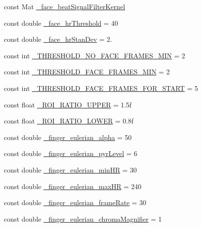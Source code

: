 \begin{DoxyCompactItemize}
\item 
const Mat \hyperlink{namespace_m_h_r_a846528ce2187823d06b73caadf751570}{\+\_\+face\+\_\+beat\+Signal\+Filter\+Kernel}
\item 
const double \hyperlink{namespace_m_h_r_a1e8025b0c611a1a8b4bf74baca52c91c}{\+\_\+face\+\_\+hr\+Threshold} = 40
\item 
const double \hyperlink{namespace_m_h_r_a0eb61186bc00ecb180d50821bee1d360}{\+\_\+face\+\_\+hr\+Stan\+Dev} = 2.
\item 
const int \hyperlink{namespace_m_h_r_adc786b108805d8d2ad944595ea2b7092}{\+\_\+\+T\+H\+R\+E\+S\+H\+O\+L\+D\+\_\+\+N\+O\+\_\+\+F\+A\+C\+E\+\_\+\+F\+R\+A\+M\+E\+S\+\_\+\+M\+I\+N} = 2
\item 
const int \hyperlink{namespace_m_h_r_a90f94ddb83c7c54b9b0836586a51ad43}{\+\_\+\+T\+H\+R\+E\+S\+H\+O\+L\+D\+\_\+\+F\+A\+C\+E\+\_\+\+F\+R\+A\+M\+E\+S\+\_\+\+M\+I\+N} = 2
\item 
const int \hyperlink{namespace_m_h_r_a3c94a936257b6f3257fb7a7768ff4377}{\+\_\+\+T\+H\+R\+E\+S\+H\+O\+L\+D\+\_\+\+F\+A\+C\+E\+\_\+\+F\+R\+A\+M\+E\+S\+\_\+\+F\+O\+R\+\_\+\+S\+T\+A\+R\+T} = 5
\item 
const float \hyperlink{namespace_m_h_r_a4059754ac07ffb5b08e096059f347a82}{\+\_\+\+R\+O\+I\+\_\+\+R\+A\+T\+I\+O\+\_\+\+U\+P\+P\+E\+R} = 1.\+5f
\item 
const float \hyperlink{namespace_m_h_r_a8a54577ca92c7aa81cc87355a7160063}{\+\_\+\+R\+O\+I\+\_\+\+R\+A\+T\+I\+O\+\_\+\+L\+O\+W\+E\+R} = 0.\+8f
\item 
const double \hyperlink{namespace_m_h_r_abe389732cdfc0aa8ebf51a84c4e645a4}{\+\_\+finger\+\_\+eulerian\+\_\+alpha} = 50
\item 
const double \hyperlink{namespace_m_h_r_a197af9978c9b4d443571197f5ad1b019}{\+\_\+finger\+\_\+eulerian\+\_\+pyr\+Level} = 6
\item 
const double \hyperlink{namespace_m_h_r_a2d844de82559885b3d8a333c82b1a733}{\+\_\+finger\+\_\+eulerian\+\_\+min\+H\+R} = 30
\item 
const double \hyperlink{namespace_m_h_r_ab2ef19fc7e685e8a85fbbbc75320fd6e}{\+\_\+finger\+\_\+eulerian\+\_\+max\+H\+R} = 240
\item 
const double \hyperlink{namespace_m_h_r_a6a102813ef2ea5aa11cadcc9ebaa5bbc}{\+\_\+finger\+\_\+eulerian\+\_\+frame\+Rate} = 30
\item 
const double \hyperlink{namespace_m_h_r_adc0b183529468e1b7d2eec8275c004a6}{\+\_\+finger\+\_\+eulerian\+\_\+chroma\+Magnifier} = 1
\item 

\end{DoxyCompactItemize}
